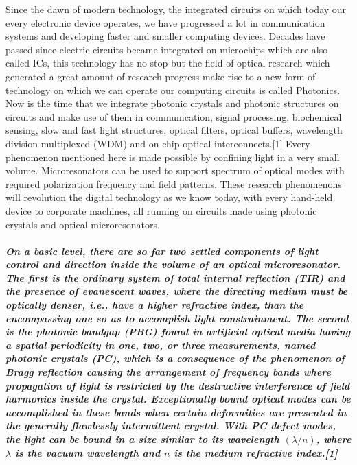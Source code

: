 \normalfont \large Since the dawn of modern technology, the integrated circuits on which today our every electronic device operates, we have progressed a lot in communication systems and developing faster and smaller computing devices. Decades have passed since electric circuits became integrated on microchips which are also called ICs, this technology has no stop but the field of optical research which generated a great amount of research progress make rise to a new form of technology on which we can operate our computing circuits is called Photonics. Now is the time that we integrate photonic crystals and photonic structures on circuits and make use of them in communication, signal processing, biochemical sensing, slow and fast light structures, optical filters, optical buffers, wavelength division-multiplexed (WDM) and on chip optical interconnects.[1] Every phenomenon mentioned here is made possible by confining light in a very small volume. Microresonators can be used to support spectrum of optical modes with required polarization frequency and field patterns. These research phenomenons will revolution the digital technology as we know today, with every hand-held device to corporate machines, all running on circuits made using photonic crystals and optical microresonators. 
\subparagraph{\normalfont \large On a basic level, there are so far two settled components of light control and direction inside the volume of an optical microresonator. The first is the ordinary system of total internal reflection (TIR) and the presence of evanescent waves, where the directing medium must be optically denser, i.e., have a higher refractive index, than the encompassing one so as to accomplish light constrainment. The second is the photonic bandgap (PBG) found in artificial optical media having a spatial periodicity in one, two, or three measurements, named photonic crystals (PC), which is a consequence of the phenomenon of Bragg reflection causing the arrangement of frequency bands where propagation of light is restricted by the destructive interference of field harmonics inside the crystal. Exceptionally bound optical modes can be accomplished in these bands when certain deformities are presented in the generally flawlessly intermittent crystal. With PC defect modes, the light can be bound in a size similar to its wavelength $(\lambda/n)$, where $\lambda$ is the vacuum wavelength and $n$ is the medium refractive index.[1]}

